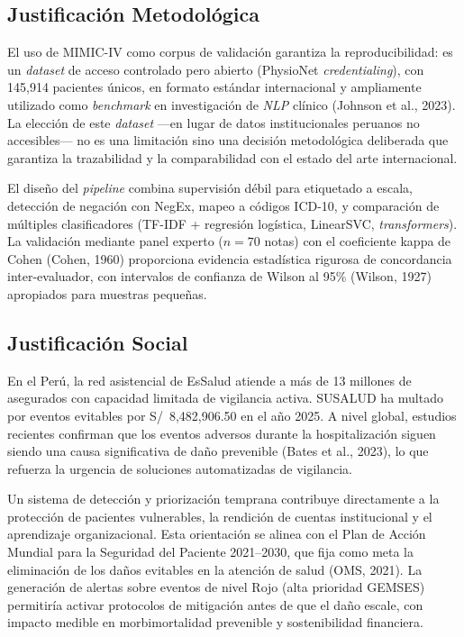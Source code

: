 \documentclass[12pt,a4paper,oneside]{book}
\begin{document}
\subsection{Justificación Metodológica}

El uso de MIMIC-IV como corpus de validación garantiza la reproducibilidad: es un \textit{dataset} de acceso controlado pero abierto (PhysioNet \textit{credentialing}), con 145{,}914 pacientes únicos, en formato estándar internacional y ampliamente utilizado como \textit{benchmark} en investigación de \textit{NLP} clínico (Johnson et al., 2023). La elección de este \textit{dataset} ---en lugar de datos institucionales peruanos no accesibles--- no es una limitación sino una decisión metodológica deliberada que garantiza la trazabilidad y la comparabilidad con el estado del arte internacional.

El diseño del \textit{pipeline} combina supervisión débil para etiquetado a escala, detección de negación con NegEx, mapeo a códigos ICD-10, y comparación de múltiples clasificadores (TF-IDF + regresión logística, LinearSVC, \textit{transformers}). La validación mediante panel experto ($n = 70$ notas) con el coeficiente kappa de Cohen (Cohen, 1960) proporciona evidencia estadística rigurosa de concordancia inter-evaluador, con intervalos de confianza de Wilson al 95\% (Wilson, 1927) apropiados para muestras pequeñas.

\subsection{Justificación Social}

En el Perú, la red asistencial de EsSalud atiende a más de 13 millones de asegurados con capacidad limitada de vigilancia activa. SUSALUD ha multado por eventos evitables por S/~8{,}482{,}906.50 en el año 2025. A nivel global, estudios recientes confirman que los eventos adversos durante la hospitalización siguen siendo una causa significativa de daño prevenible (Bates et al., 2023), lo que refuerza la urgencia de soluciones automatizadas de vigilancia.

Un sistema de detección y priorización temprana contribuye directamente a la protección de pacientes vulnerables, la rendición de cuentas institucional y el aprendizaje organizacional. Esta orientación se alinea con el Plan de Acción Mundial para la Seguridad del Paciente 2021--2030, que fija como meta la eliminación de los daños evitables en la atención de salud (OMS, 2021). La generación de alertas sobre eventos de nivel Rojo (alta prioridad GEMSES) permitiría activar protocolos de mitigación antes de que el daño escale, con impacto medible en morbimortalidad prevenible y sostenibilidad financiera.
\end{document}
